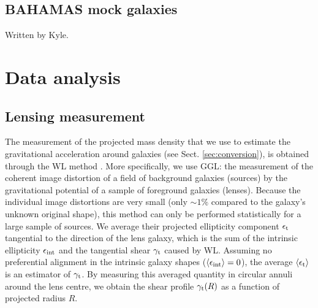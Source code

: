 \documentclass[usenatbib]{mnras}
\newcommand{\lan}{\langle}
\newcommand{\ran}{\rangle}
\newcommand{\un}[1]{_{\rm #1}}
\begin{document}


\subsection{BAHAMAS mock galaxies}
\label{sec:bahamas_mocks}
Written by Kyle.

\section{Data analysis}
\label{sec:analysis}

\subsection{Lensing measurement}
\label{sec:lensing}

The measurement of the projected mass density that we use to estimate the gravitational acceleration around galaxies (see Sect. \ref{sec:conversion}), is obtained through the WL method \cite[for a general introduction, see][]{bartelmann2001,schneider2006}. More specifically, we use GGL: the measurement of the coherent image distortion of a field of background galaxies (sources) by the gravitational potential of a sample of foreground galaxies (lenses). Because the individual image distortions are very small (only $\sim1\%$ compared to the galaxy's unknown original shape), this method can only be performed statistically for a large sample of sources. We average their projected ellipticity component $\epsilon\un{t}$ tangential to the direction of the lens galaxy, which is the sum of the intrinsic ellipticity $\epsilon\un{int}$ and the tangential shear $\gamma\un{t}$ caused by WL. Assuming no preferential alignment in the intrinsic galaxy shapes ($\lan\epsilon\un{int}\ran=0$), the average $\lan\epsilon\un{t}\ran$ is an estimator of $\gamma\un{t}$. By measuring this averaged quantity in circular annuli around the lens centre, we obtain the shear profile $\gamma\un{t}(R)$ as a function of projected radius $R$.
\end{document}
